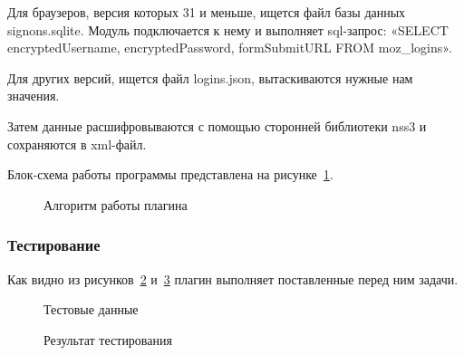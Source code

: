 Для браузеров, версия которых 31 и меньше, ищется файл базы данных signons.sqlite. Модуль подключается к нему и выполняет sql-запрос: «SELECT encryptedUsername, encryptedPassword, formSubmitURL FROM moz\_logins».

Для других версий, ищется файл logins.json, вытаскиваются нужные нам значения.

Затем данные расшифровываются с помощью сторонней библиотеки nss3 и сохраняются в xml-файл.

Блок-схема работы программы представлена на рисунке~\ref{teresh_2:teresh_2}.

\begin{figure}[h!]
\caption{Алгоритм работы плагина}
\label{teresh_2:teresh_2}
\end{figure}

\subsubsection{Тестирование}

Как видно из рисунков~\ref{teresh_3:teresh_3} и~\ref{teresh_4:teresh_4} плагин выполняет поставленные перед ним задачи.

\begin{figure}[h!]
\caption{Тестовые данные}
\label{teresh_3:teresh_3}
\end{figure}

\clearpage
\begin{figure}[h!]
\caption{Результат тестирования}
\label{teresh_4:teresh_4}
\end{figure}

\clearpage
